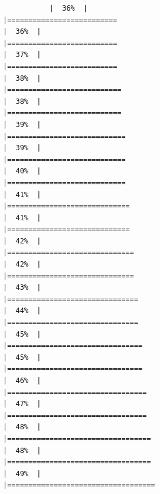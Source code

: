 \documentclass[
]{article}
\begin{document}
\begin{verbatim}
           |  36%  |                                                                              |==========================                                            |  36%  |                                                                              |==========================                                            |  37%  |                                                                              |==========================                                            |  38%  |                                                                              |===========================                                           |  38%  |                                                                              |===========================                                           |  39%  |                                                                              |============================                                          |  39%  |                                                                              |============================                                          |  40%  |                                                                              |============================                                          |  41%  |                                                                              |=============================                                         |  41%  |                                                                              |=============================                                         |  42%  |                                                                              |==============================                                        |  42%  |                                                                              |==============================                                        |  43%  |                                                                              |===============================                                       |  44%  |                                                                              |===============================                                       |  45%  |                                                                              |================================                                      |  45%  |                                                                              |================================                                      |  46%  |                                                                              |=================================                                     |  47%  |                                                                              |=================================                                     |  48%  |                                                                              |==================================                                    |  48%  |                                                                              |==================================                                    |  49%  |                                                                              |===================================                         
\end{verbatim}
\end{document}
